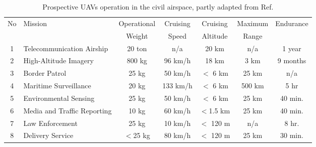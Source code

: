 \begin{table}
 \begin{center}
   \caption{Prospective UAVs operation in the civil airspace, partly adapted from Ref.\cite{degarmo:04}}
  \begin{tabular}{clccccc}
  \hline  
  No & Mission  &  Operational & Cruising  & Cruising & Maximum & Endurance\\ 
   & & Weight &  Speed & Altitude  & Range &     \\
  \hline\hline
  1 & Telecommunication Airship\cite{degarmo:04,Colozza:03,Colozza:05}  & 20 ton & n/a & 20 km & n/a & 1 year\\ %
  2 & High-Altitude Imagery\cite{degarmo:04,Romeo:04}  & 800 kg & 96 km/h & 18 km & 3 km & 9 months\\  %
  3 & Border Patrol\cite{degarmo:04,Girard:04}  &  25 kg & 50 km/h & $<$ 6 km & 25 km & n/a \\  %
  4 & Maritime Surveillance\cite{degarmo:04,Meester:13} &  20 kg & 133 km/h & $<$ 6 km & 500 km  & 5 hr  \\  %
  5 & Environmental Sensing\cite{degarmo:04,Casbeer:05}  &  25 kg & 50 km/h & $<$ 6 km & 25 km & 40 min. \\ %
  6 & Media and Traffic Reporting\cite{degarmo:04,Frew:04}  & 10 kg & 60 km/h & $<$1.5 km & 25 km & 40 min.  \\  %
  7 & Law Enforcement\cite{degarmo:04,Herwitz:04} &  25 kg & 10 km/h & $<$ 120 m & n/a & 8 hr.  \\ %
  8 & Delivery Service\cite{D'Andrea:14} & $<$25 kg & 80 km/h & $<$ 120 m & 25 km & 30 min. \\  %
  \hline 
  \end{tabular} 
  \label{t:Category}
 \end{center}
\end{table}

